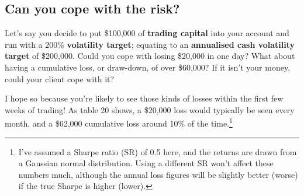 \subsection*{Can you cope with the risk?}

Let's say you decide to put \$100,000 of \textbf{trading capital} into your account and run with a 200\% \textbf{volatility target}; equating to an \textbf{annualised cash volatility target} of \$200,000. Could you cope with losing \$20,000 in one day? What about having a cumulative loss, or draw-down, of over \$60,000? If it isn't your money, could your client cope with it?

I hope so because you're likely to see those kinds of losses within the first few weeks of trading! As table 20 shows, a \$20,000 loss would typically be seen every month, and a \$62,000 cumulative loss around 10\% of the time.\footnote{I've assumed a Sharpe ratio (SR) of 0.5 here, and the returns are drawn from a Gaussian normal distribution. Using a different SR won't affect these numbers much, although the annual loss figures will be slightly better (worse) if the true Sharpe is higher (lower).}

 \begingroup \small \centering
{}
\par \endgroup

